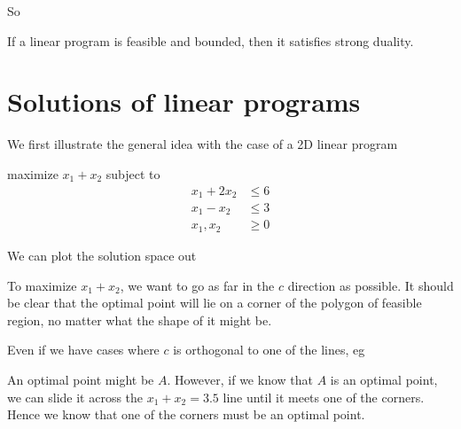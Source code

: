 \documentclass[a4paper]{article}
\begin{document}
So
\begin{thm}[]
  If a linear program is feasible and bounded, then it satisfies strong duality.
\end{thm}

\section{Solutions of linear programs}
We first illustrate the general idea with the case of a 2D linear program

\begin{center}
  maximize $x_1 + x_2$ subject to
  \begin{align*}
    x_1 + 2x_2 &\leq 6\\
    x_1 - x_2 &\leq 3\\
    x_1, x_2 &\geq 0
  \end{align*}
\end{center}

We can plot the solution space out
\begin{center}
\end{center}

To maximize $x_1 + x_2$, we want to go as far in the $c$ direction as possible. It should be clear that the optimal point will lie on a corner of the polygon of feasible region, no matter what the shape of it might be.

Even if we have cases where $c$ is orthogonal to one of the lines, eg
\begin{center}
\end{center}
An optimal point might be $A$. However, if we know that $A$ is an optimal point, we can slide it across the $x_1 + x_2 = 3.5$ line until it meets one of the corners. Hence we know that one of the corners must be an optimal point.
\end{document}

